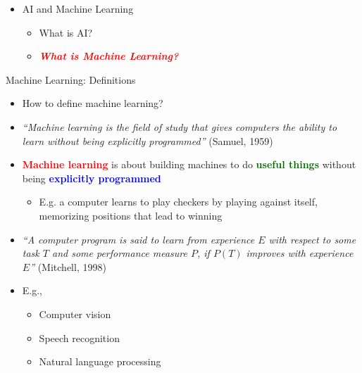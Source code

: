 \documentclass[
  10pt,
  ignorenonframetext,
]{beamer}
\providecommand{\tightlist}{%
  \setlength{\itemsep}{0pt}\setlength{\parskip}{0pt}}
\begin{document}
\begin{frame}{}
\label{section-2}
\begin{itemize}
\tightlist
\item
  AI and Machine Learning

  \begin{itemize}
  \tightlist
  \item
    What is AI?
  \item
    \emph{\textbf{\textcolor{red}{What is Machine Learning?}}}
  \end{itemize}
\end{itemize}
\end{frame}

\begin{frame}{Machine Learning: Definitions}
\label{machine-learning-definitions}
\begin{itemize}
\item
  How to define machine learning?
\item
  \emph{``Machine learning is the field of study that gives computers
  the ability to learn without being explicitly programmed''} (Samuel,
  1959)
\item
  \textbf{\textcolor{red}{Machine learning}} is about building machines
  to do \textbf{\textcolor{darkgreen}{useful things}} without being
  \textbf{\textcolor{blue}{explicitly programmed}}

  \begin{itemize}
  \tightlist
  \item
    E.g. a computer learns to play checkers by playing against itself,
    memorizing positions that lead to winning
  \end{itemize}
\item
  \emph{``A computer program is said to learn from experience \(E\) with
  respect to some task \(T\) and some performance measure \(P\), if
  \(P(T)\) improves with experience \(E\)''} (Mitchell, 1998)
\item
  E.g.,

  \begin{itemize}
  \tightlist
  \item
    Computer vision
  \item
    Speech recognition
  \item
    Natural language processing
  \end{itemize}
\end{itemize}
\end{frame}
\end{document}
